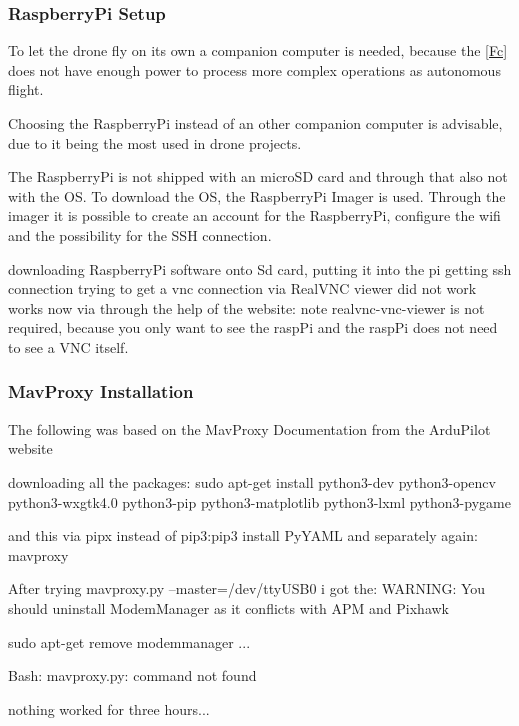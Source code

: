 \documentclass{article}
\begin{document}
	\subsubsection{RaspberryPi Setup}
	
	To let the drone fly on its own a companion computer is needed, because the \ref{Fc} does not have enough power to process more complex operations as autonomous flight.
	
	Choosing the RaspberryPi instead of an other companion computer is advisable, due to it being the most used in drone projects.
	
	The RaspberryPi is not shipped with an microSD card and through that also not with the \gls{OS}. To download the \gls{OS}, the RaspberryPi Imager is used. Through the imager it is possible to create an account for the RaspberryPi,  configure the wifi and the possibility for the \gls{SSH} connection. 
	\begin{Explanation}

	\end{Explanation}
	
	downloading RaspberryPi software onto Sd card, putting it into the pi
	getting ssh connection
	trying to get a vnc connection via RealVNC viewer did not work
	works now via through the help of the website: \cite{ionisvnctutorial} 
	note realvnc-vnc-viewer is not required, because you only want to see the raspPi and the raspPi does not need to see a VNC itself.
	\subsubsection{MavProxy Installation}
	The following was based on the MavProxy Documentation \cite{MavProxydocs} from the ArduPilot website
	
	downloading all the packages: sudo apt-get install python3-dev python3-opencv python3-wxgtk4.0 python3-pip python3-matplotlib python3-lxml python3-pygame
	
	and this via pipx instead of pip3:pip3 install PyYAML
	and separately again: mavproxy
	
	After trying mavproxy.py --master=/dev/ttyUSB0 i got the:
	WARNING: You should uninstall ModemManager as it conflicts with APM and Pixhawk
	
	sudo apt-get remove modemmanager ...
	
	Bash: mavproxy.py: command not found
	
	nothing worked for three hours...
\end{document}
